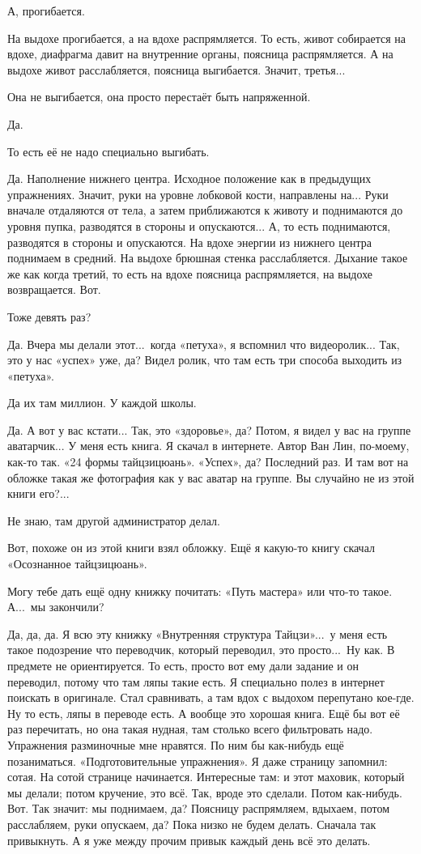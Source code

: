 \M
А, прогибается.

\I
На выдохе прогибается, а на вдохе распрямляется. То есть, живот собирается на вдохе,
диафрагма давит на внутренние органы, поясница распрямляется.
А на выдохе живот расслабляется, поясница выгибается. Значит, третья...

\M
Она не выгибается, она просто перестаёт быть напряженной.

\I
Да. 

\M
То есть её не надо
специально выгибать.

\I
Да. Наполнение нижнего центра. Исходное положение как в предыдущих упражнениях.
Значит, руки на уровне лобковой кости, направлены на... Руки вначале отдаляются от тела,
а затем приближаются к животу и поднимаются до уровня пупка, разводятся
в стороны и опускаются... А, то есть поднимаются, разводятся в стороны и опускаются.
На вдохе энергии из нижнего центра поднимаем в средний.
На выдохе брюшная стенка расслабляется. Дыхание такое
же как когда третий, то есть на вдохе поясница
распрямляется, на выдохе возвращается. Вот.

\M
Тоже девять раз?

\I
Да. Вчера мы делали этот...\ когда «петуха», я вспомнил что видеоролик...
Так, это у нас «успех» уже, да? Видел ролик, что там
есть три способа выходить из «петуха».

\M
Да их там миллион. У каждой школы.

\I
Да. А вот у вас кстати... Так, это «здоровье», да?
Потом, я видел у
вас на группе аватарчик...
У меня есть книга. Я скачал в интернете. Автор Ван Лин, по-моему, как-то так.
«24 формы тайцзицюань». «Успех», да? Последний раз. И там вот на обложке такая же фотография
как у вас аватар на группе. Вы случайно не из этой книги его?...

\M
Не знаю, там другой администратор делал.

\I
Вот, похоже он из этой книги взял обложку.
Ещё я какую-то
книгу скачал «Осознанное тайцзицюань».

\M
Могу тебе дать ещё одну книжку почитать: «Путь мастера» или что-то такое.
А...\ мы закончили?

\I
Да, да, да.
Я всю эту книжку «Внутренняя структура Тайцзи»...\ у меня есть такое подозрение что переводчик,
который переводил, это просто...\ Ну как. В предмете не ориентируется.
То есть, просто вот ему дали задание и он переводил, потому что там ляпы такие есть.
Я специально полез в интернет поискать в оригинале. Стал сравнивать, а там вдох с выдохом
перепутано кое-где. Ну то есть, ляпы в переводе есть. А вообще это хорошая книга.
Ещё бы вот её раз перечитать, но она такая нудная, там столько всего фильтровать надо.
Упражнения разминочные мне нравятся.
По ним бы как-нибудь ещё позаниматься.
«Подготовительные упражнения».
Я даже страницу запомнил: сотая.
На сотой странице начинается. Интересные там: и этот маховик, который мы делали; потом кручение,
это всё. Так, вроде это сделали.
Потом как-нибудь. Вот. Так значит: мы поднимаем, да? Поясницу распрямляем, вдыхаем,
потом расслабляем, руки опускаем, да?
Пока низко не будем делать. Сначала так привыкнуть.
А я уже между прочим
привык каждый день всё
это делать.

